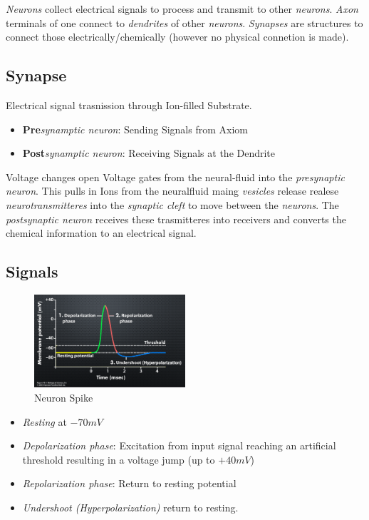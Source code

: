 \documentclass[
    fontsize      = 11pt,
    paper         = a4,
    twoside       = false,
    parskip       = half,
    pagesize      = false,
]{scrartcl}
\providecommand{\tightlist}{%
  \setlength{\itemsep}{0pt}\setlength{\parskip}{0pt}}
\begin{document}
\emph{Neurons} collect electrical signals to process and transmit to
other \emph{neurons}. \emph{Axon} terminals of one connect to
\emph{dendrites} of other \emph{neurons}. \emph{Synapses} are structures
to connect those electrically/chemically (however no physical connetion
is made).

\hypertarget{synapse}{%
\subsection{Synapse}\label{synapse}}

Electrical signal trasnission through Ion-filled Substrate.

\begin{itemize}
\tightlist
\item
  \textbf{Pre}\emph{synamptic neuron}: Sending Signals from Axiom
\item
  \textbf{Post}\emph{synamptic neuron}: Receiving Signals at the
  Dendrite
\end{itemize}

Voltage changes open Voltage gates from the neural-fluid into the
\emph{presynaptic neuron}. This pulls in Ions from the neuralfluid maing
\emph{vesicles} release realese \emph{neurotransmitteres} into the
\emph{synaptic cleft} to move between the \emph{neurons}. The
\emph{postsynaptic neuron} receives these trasmitteres into receivers
and converts the chemical information to an electrical signal.

\hypertarget{signals}{%
\subsection{Signals}\label{signals}}

\begin{figure}[htp]
\centering
\includegraphics[width=0.5\textwidth]{neuron-spike.png}
\caption{Neuron Spike}
\end{figure}

\begin{itemize}
\tightlist
\item
  \emph{Resting} at \(-70\si{mV}\)
\item
  \emph{Depolarization phase}: Excitation from input signal reaching an
  artificial threshold resulting in a voltage jump (up to
  \(+40\si{mV}\))
\item
  \emph{Repolarization phase}: Return to resting potential
\item
  \emph{Undershoot (Hyperpolarization)} return to resting.
\end{itemize}
\end{document}
